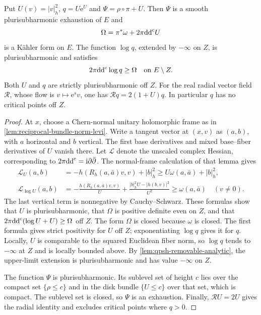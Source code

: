 \begin{proposition}\label{prop:negative-bundle-logarithmic-weight}
Put $U(v)=|v|_h^2$, $q=U\mathrm e^U$ and
$\Psi=\rho\circ\pi+U$. Then $\Psi$ is a smooth
plurisubharmonic exhaustion of $E$ and
\[
 \Omega=\pi^*\omega+2\pi\mathrm{dd}^{\mathrm{c}} U
\]
is a K\"ahler form on $E$. The function $\log q$, extended by
$-\infty$ on $Z$, is plurisubharmonic and satisfies
\[
 2\pi\mathrm{dd}^{\mathrm{c}}\log q\geq\Omega\quad\text{on }E\setminus Z.
\]
Both $U$ and $q$ are strictly plurisubharmonic off $Z$.
For the real radial vector field $\mathcal R$, whose flow is
$v\mapsto\mathrm e^s v$, one has
$\mathcal Rq=2(1+U)q$. In particular $q$ has no critical
points off $Z$.
\end{proposition}
\begin{proof}
At $x$, choose a Chern-normal unitary holomorphic frame as in
\cref{lem:reciprocal-bundle-norm-levi}. Write a tangent vector at
$(x,v)$ as $(a,b)$, with $a$ horizontal and $b$ vertical.
The first base derivatives and mixed base--fiber derivatives of
$U$ vanish there. Let $\mathcal L$ denote the unscaled complex
Hessian, corresponding to $2\pi\mathrm{dd}^{\mathrm{c}}=\mathrm i\partial\bar\partial$.
The normal-frame calculation of that lemma gives
\[
 \begin{aligned}
 \mathcal L_U(a,b)
   &=-h(R_h(a,\bar a)v,v)+|b|_h^2
      \geq U\omega(a,\bar a)+|b|_h^2,\\
 \mathcal L_{\log U}(a,b)
   &=-\frac{h(R_h(a,\bar a)v,v)}U
       +\frac{|b|_h^2U-|h(b,v)|^2}{U^2}
      \geq\omega(a,\bar a)\quad(v\ne0).
 \end{aligned}
\]
The last vertical term is nonnegative by Cauchy--Schwarz.
These formulas show that $U$ is plurisubharmonic, that
$\Omega$ is positive definite even on $Z$, and that
$2\pi\mathrm{dd}^{\mathrm{c}}(\log U+U)\geq\Omega$ off $Z$.
The form $\Omega$ is closed because $\omega$ is closed.
The first formula gives strict positivity for $U$ off $Z$;
exponentiating $\log q$ gives it for $q$.
Locally, $U$ is comparable to the squared Euclidean fiber norm,
so $\log q$ tends to $-\infty$ at $Z$ and is locally bounded above.
By \cref{lem:qpsh-removable-analytic}, the upper-limit extension
is plurisubharmonic and has value $-\infty$ on $Z$.

The function $\Psi$ is plurisubharmonic. Its sublevel set of
height $c$ lies over the compact set $\{\rho\leq c\}$ and in
the disk bundle $\{U\leq c\}$ over that set, which is compact.
The sublevel set is closed, so $\Psi$ is an exhaustion. Finally,
$\mathcal RU=2U$ gives the radial identity and excludes critical
points where $q>0$.
\end{proof}

